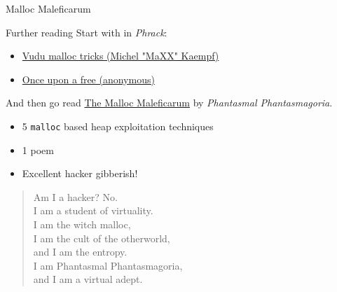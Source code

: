 \documentclass[9pt,aspectratio=169]{beamer}
\begin{document}
\begin{frame}[label={sec:orgd35f6fd},fragile]{Malloc Maleficarum}
 \begin{block}{Further reading}
Start with in \emph{Phrack}:
\begin{itemize}
\item \href{http://phrack.org/issues/57/8.html\#article}{Vudu malloc tricks (Michel "MaXX" Kaempf)}
\item \href{http://phrack.org/issues/57/9.html}{Once upon a free (anonymous)}
\end{itemize}

And then go read \href{https://seclists.org/bugtraq/2005/Oct/118}{The Malloc Maleficarum} by \emph{Phantasmal Phantasmagoria}.
\begin{itemize}
\item 5 \texttt{malloc} based heap exploitation techniques
\item 1 poem
\item Excellent hacker gibberish!
\end{itemize}

\begin{verse}
Am I a hacker? No.\\[0pt]
I am a student of virtuality.\\[0pt]
I am the witch malloc,\\[0pt]
I am the cult of the otherworld,\\[0pt]
and I am the entropy.\\[0pt]
I am Phantasmal Phantasmagoria,\\[0pt]
and I am a virtual adept.\\[0pt]
\end{verse}
\end{block}
\end{frame}
\end{document}
